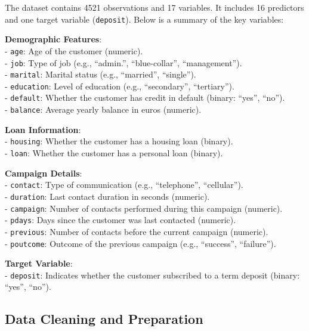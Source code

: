 \documentclass[
]{book}
\newcommand{\passthrough}[1]{#1}
\theoremstyle{definition}
\theoremstyle{definition}
\theoremstyle{definition}
\theoremstyle{definition}
\theoremstyle{remark}
\begin{document}
The dataset contains 4521 observations and 17 variables. It includes 16 predictors and one target variable (\passthrough{\lstinline!deposit!}). Below is a summary of the key variables:

\textbf{Demographic Features}:\\
- \passthrough{\lstinline!age!}: Age of the customer (numeric).\\
- \passthrough{\lstinline!job!}: Type of job (e.g., ``admin.'', ``blue-collar'', ``management'').\\
- \passthrough{\lstinline!marital!}: Marital status (e.g., ``married'', ``single'').\\
- \passthrough{\lstinline!education!}: Level of education (e.g., ``secondary'', ``tertiary'').\\
- \passthrough{\lstinline!default!}: Whether the customer has credit in default (binary: ``yes'', ``no'').\\
- \passthrough{\lstinline!balance!}: Average yearly balance in euros (numeric).

\textbf{Loan Information}:\\
- \passthrough{\lstinline!housing!}: Whether the customer has a housing loan (binary).\\
- \passthrough{\lstinline!loan!}: Whether the customer has a personal loan (binary).

\textbf{Campaign Details}:\\
- \passthrough{\lstinline!contact!}: Type of communication (e.g., ``telephone'', ``cellular'').\\
- \passthrough{\lstinline!duration!}: Last contact duration in seconds (numeric).\\
- \passthrough{\lstinline!campaign!}: Number of contacts performed during this campaign (numeric).\\
- \passthrough{\lstinline!pdays!}: Days since the customer was last contacted (numeric).\\
- \passthrough{\lstinline!previous!}: Number of contacts before the current campaign (numeric).\\
- \passthrough{\lstinline!poutcome!}: Outcome of the previous campaign (e.g., ``success'', ``failure'').

\textbf{Target Variable}:\\
- \passthrough{\lstinline!deposit!}: Indicates whether the customer subscribed to a term deposit (binary: ``yes'', ``no'').

\subsection*{Data Cleaning and Preparation}\label{data-cleaning-and-preparation}
\end{document}

